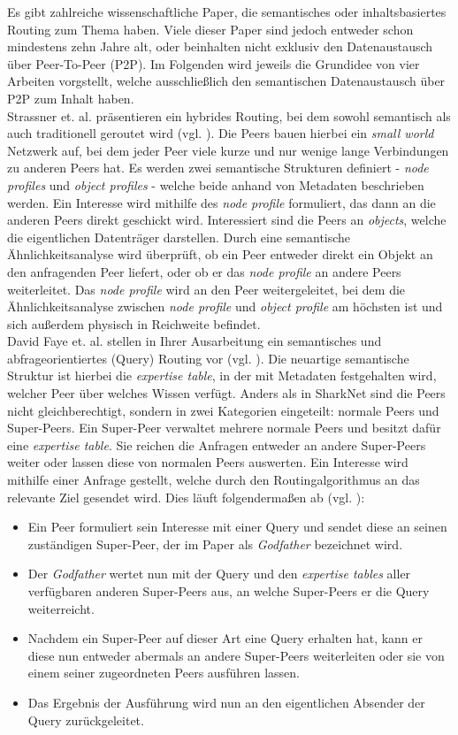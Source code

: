Es gibt zahlreiche wissenschaftliche Paper, die semantisches oder inhaltsbasiertes Routing zum Thema haben. Viele dieser Paper sind jedoch entweder schon mindestens zehn Jahre alt, oder beinhalten nicht exklusiv den Datenaustausch über Peer-To-Peer (P2P). Im Folgenden wird jeweils die Grundidee von vier Arbeiten vorgstellt, welche ausschließlich den semantischen Datenaustausch über P2P zum Inhalt haben.\\
Strassner et. al. präsentieren ein hybrides Routing, bei dem sowohl semantisch als auch traditionell geroutet wird (vgl. \citet[S. 164ff]{Strassner2010}). Die Peers bauen hierbei ein \textit{small world} Netzwerk auf, bei dem jeder Peer viele kurze und nur wenige lange Verbindungen zu anderen Peers hat. Es werden zwei semantische Strukturen definiert - \textit{node profiles} und \textit{object profiles} - welche beide anhand von Metadaten beschrieben werden. Ein Interesse wird mithilfe des \textit{node profile} formuliert, das dann an die anderen Peers direkt geschickt wird. Interessiert sind die Peers an \textit{objects}, welche die eigentlichen Datenträger darstellen. Durch eine semantische Ähnlichkeitsanalyse wird überprüft, ob ein Peer entweder direkt ein Objekt an den anfragenden Peer liefert, oder ob er das \textit{node profile} an andere Peers weiterleitet. Das \textit{node profile} wird an den Peer weitergeleitet, bei dem die Ähnlichkeitsanalyse zwischen \textit{node profile} und \textit{object profile} am höchsten ist und sich außerdem physisch in Reichweite befindet. \\
David Faye et. al. stellen in Ihrer Ausarbeitung ein semantisches und abfrageorientiertes (Query) Routing vor (vgl. \citet[S. 365f]{Faye2007}). Die neuartige semantische Struktur ist hierbei die \textit{expertise table}, in der mit Metadaten festgehalten wird, welcher Peer über welches Wissen verfügt. Anders als in SharkNet sind die Peers nicht gleichberechtigt, sondern in zwei Kategorien eingeteilt: normale Peers und Super-Peers. Ein Super-Peer verwaltet mehrere normale Peers und besitzt dafür eine \textit{expertise table}. Sie reichen die Anfragen entweder an andere Super-Peers weiter oder lassen diese von normalen Peers auswerten. Ein Interesse wird mithilfe einer Anfrage gestellt, welche durch den Routingalgorithmus an das relevante Ziel gesendet wird. Dies läuft folgendermaßen ab (vgl. \citet[S. 370f]{Faye2007}):
\begin{itemize}
	\item Ein Peer formuliert sein Interesse mit einer Query und sendet diese an seinen zuständigen Super-Peer, der im Paper als \textit{Godfather} bezeichnet wird.
	\item Der \textit{Godfather} wertet nun mit der Query und den \textit{expertise tables} aller verfügbaren anderen Super-Peers aus, an welche Super-Peers er die Query weiterreicht.
	\item Nachdem ein Super-Peer auf dieser Art eine Query erhalten hat, kann er diese nun entweder abermals an andere Super-Peers weiterleiten oder sie von einem seiner zugeordneten Peers ausführen lassen.
	\item Das Ergebnis der Ausführung wird nun an den eigentlichen Absender der Query zurückgeleitet.
\end{itemize}
